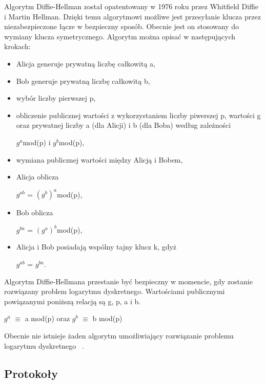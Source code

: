 \documentclass[12p]{article}
\begin{document}
Algorytm Diffie-Hellman został opatentowany w 1976 roku przez Whitfield Diffie i Martin Hellman. Dzięki temu algorytmowi możliwe jest przesyłanie klucza przez niezabezpieczone łącze w bezpieczny sposób. Obecnie jest on stosowany do wymiany klucza symetrycznego. Algorytm można opisać w następujących krokach: 
\begin{itemize}
\item Alicja generuje prywatną liczbę całkowitą a,
\item Bob generuje prywatną liczbę całkowitą b,
\item wybór liczby pierwszej p,
\item obliczenie publicznej wartości z wykorzystaniem liczby piwerszej p, wartości g oraz prywatnej liczby a (dla Alicji) i b (dla Boba) według zależności
\begin{center}
$g^{a}$mod(p) i $g^{b}$mod(p),
\end{center}
\item wymiana publicznej wartości między Alicją i Bobem,
\item Alicja oblicza
\begin{center}
$g^{ab}$ = $(g^{b})^{a}$mod(p),
\end{center}
\item Bob oblicza
\begin{center}
$g^{ba}$ = $(g^{a})^{b}$mod(p),
\end{center}
\item Alicja i Bob posiadają wspólny tajny klucz k, gdyż
\begin{center}
$g^{ab}$ = $g^{ba}$.
\end{center}
\end{itemize}

Algorytm Diffie-Hellmana przestanie być bezpieczny w momencie, gdy zostanie rozwiązany problem logarytmu dyskretnego. Wartościami publicznymi powiązanymi poniższą relacją są g, p, a i b.
\begin{center}
$g^{a}$ $\equiv$ a mod(p) oraz $g^{b}$ $\equiv$ b mod(p)
\end{center}
Obecnie nie istnieje żaden algorytm umożliwiający rozwiązanie problemu logarytmu dyskretnego ~\cite{DH}.

\newpage
\subsection{Protokoły}
\end{document}
